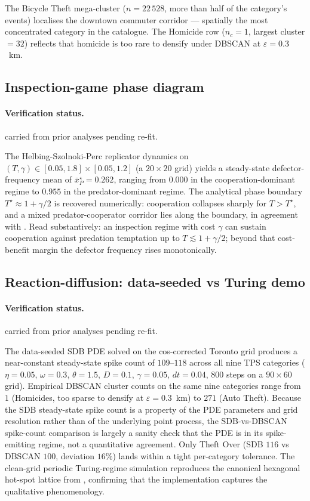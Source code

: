 \documentclass[article,shortnames,nojss]{jss}
\begin{document}
The Bicycle Theft mega-cluster ($n=22\,528$, more than half of the
category's events) localises the downtown commuter corridor ---
spatially the most concentrated category in the catalogue.  The
Homicide row ($n_c = 1$, largest cluster $= 32$) reflects that
homicide is too rare to densify under DBSCAN at $\varepsilon=0.3$~km.

\subsection{Inspection-game phase diagram}\label{phys-hsp}


\paragraph*{Verification status.}
carried from prior analyses pending re-fit.

The Helbing-Szolnoki-Perc replicator dynamics on
$(T,\gamma)\in[0.05,1.8]\times[0.05,1.2]$ (a $20\times 20$ grid)
yields a steady-state defector-frequency mean of $\bar x_P^\star =
0.262$, ranging from $0.000$ in the cooperation-dominant regime to
$0.955$ in the predator-dominant regime.  The analytical phase
boundary $T^\star\approx 1+\gamma/2$ is recovered numerically:
cooperation collapses sharply for $T>T^\star$, and a mixed
predator-cooperator corridor lies along the boundary, in agreement
with \citep{helbing2010punish,szolnoki2011inspection}.  Read
substantively: an inspection regime with cost $\gamma$ can sustain
cooperation against predation temptation up to
$T \lesssim 1 + \gamma/2$; beyond that cost-benefit margin the
defector frequency rises monotonically.

\subsection{Reaction-diffusion: data-seeded vs Turing demo}\label{phys-sdb}


\paragraph*{Verification status.}
carried from prior analyses pending re-fit.

The data-seeded SDB PDE solved on the cos-corrected Toronto grid
produces a near-constant steady-state spike count of $109$--$118$
across all nine TPS categories ($\eta=0.05$, $\omega=0.3$,
$\theta=1.5$, $D=0.1$, $\gamma=0.05$, $dt=0.04$, $800$ steps on a
$90\times60$ grid).  Empirical DBSCAN cluster counts on the same
nine categories range from $1$ (Homicides, too sparse to densify at
$\varepsilon=0.3$~km) to $271$ (Auto Theft).  Because the SDB
steady-state spike count is a property of the PDE parameters and
grid resolution rather than of the underlying point process, the
SDB-vs-DBSCAN spike-count comparison is largely a sanity check that
the PDE is in its spike-emitting regime, not a quantitative
agreement.  Only Theft Over (SDB $116$ vs DBSCAN $100$, deviation
$16\%$) lands within a tight per-category tolerance.  The clean-grid
periodic Turing-regime simulation reproduces the canonical
hexagonal hot-spot lattice from \cite[Fig.~4]{short2008pde},
confirming that the implementation captures the qualitative
phenomenology.
\end{document}

